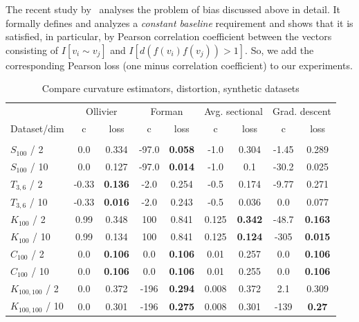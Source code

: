 \documentclass{article} %
\begin{document}
The recent study by~\cite{gosgens2019systematic} analyses the problem of bias discussed above in detail. It formally defines and analyzes a \textit{constant baseline} requirement and shows that it is satisfied, in particular, by Pearson correlation coefficient between the vectors consisting of $I[v_i \sim v_j]$ and $I[d(f(v_i)f(v_j)) > 1]$. So, we add the corresponding Pearson loss (one minus correlation coefficient) to our experiments.

\begin{table}[t]
\caption{Compare curvature estimators, distortion, synthetic datasets}
\label{tab:compare_distortion_synth}
\begin{center}
\begin{tabular}{lcccccc|cc}
&
\multicolumn{2}{c}{Ollivier} &
\multicolumn{2}{c}{Forman} &
\multicolumn{2}{c}{Avg. sectional} &
\multicolumn{2}{|c}{Grad. descent} \\
Dataset/dim & c & loss  & c & loss  & c & loss  & c & loss \\%
 \hline \\
$S_{100}$ / 2 &
0.0 & 0.334 & 
-97.0 & \textbf{0.058} & 
-1.0 & 0.304 &
-1.45 & 0.289 \\
$S_{100}$ / 10 &
0.0 & 0.127 & 
-97.0 & \textbf{0.014} & 
-1.0 & 0.1 & 
-30.2 & 0.025 \\
$T_{3,6}$ / 2 &
-0.33 & \textbf{0.136} & 
-2.0 & 0.254 & 
-0.5 & 0.174 & 
-9.77 & 0.271  \\
$T_{3,6}$ / 10 &
-0.33 & \textbf{0.016} & 
-2.0 & 0.243 & 
-0.5 & 0.036 & 
0.0 & 0.077 \\
$K_{100}$ / 2 & 
0.99 & 0.348 & 
100 & 0.841 & 
0.125 & \textbf{0.342} & 
-48.7 & \textbf{0.163} \\
$K_{100}$ / 10 & 
0.99 & 0.134 & 
100 & 0.841 & 
0.125 & \textbf{0.124} & 
-305 & \textbf{0.015} \\
$C_{100}$ / 2 & 
0.0 & \textbf{0.106} & 
0.0 & \textbf{0.106} & 
0.01 & 0.257 &
0.0 & \textbf{0.106}  \\
$C_{100}$ / 10 & 
0.0 & \textbf{0.106} & 
0.0 & \textbf{0.106} & 
0.01 & 0.255 & 
0.0 & \textbf{0.106} \\
$K_{100,100}$ / 2 &
0.0 & 0.372 & 
-196 & \textbf{0.294} & 
0.008 & 0.372 & 
2.1 & 0.309 \\
$K_{100,100}$ / 10 &
0.0 & 0.301 & 
-196 & \textbf{0.275} & 
0.008 & 0.301 & 
-139 & \textbf{0.27} \\
\end{tabular}
\end{center}
\end{table}
\end{document}
